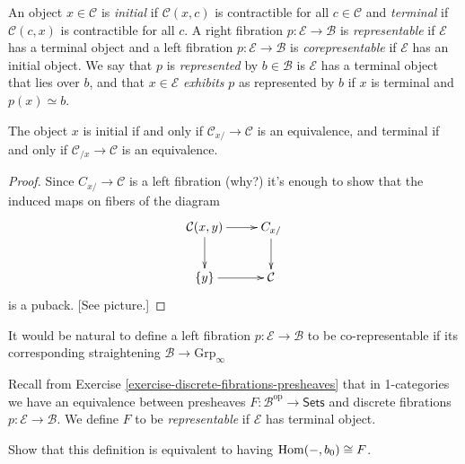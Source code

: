 \noindent
An object $x \in \mathcal{C}$ is {\it initial } if $\mathcal{C}(x,c)$ 
is contractible for all $c \in \mathcal{C}$ and
{\it terminal} if $\mathcal{C}(c,x)$ is contractible for all $c$.
A right fibration $p:\mathcal{E} \to \mathcal{B}$ is
{\it representable} if $\mathcal{E}$ has a terminal object
and a left fibration $p:\mathcal{E} \to \mathcal{B}$ is
{\it corepresentable} if $\mathcal{E}$ has an initial object.
We say that $p$ is {\it represented} by $b \in \mathcal{B}$
is $\mathcal{E}$ has a terminal object that lies over $b$,
and that $x \in \mathcal{E}$ {\it exhibits} $p$ 
as represented by $b$ if $x$ is terminal
and $p(x)\simeq b$.

\begin{lemma}
\label{lemma-equivalence-iff-initial}
The object $x$ is initial if and only if $\mathcal{C}_{x/}\to \mathcal{C}$ 
is an equivalence, and terminal if and only if $\mathcal{C}_{/x}\to \mathcal{C}$ 
is an equivalence.
\end{lemma}

\begin{proof}
Since $C_{x/}\to \mathcal{C}$ is a left fibration (why?)
it's enough to show that the induced maps on fibers of
the diagram
$$
\xymatrix{
\mathcal{C}(x,y)\ar[r]\ar[d]&C_{x/}\ar[d]\\
\{y\}\ar[r]&\mathcal{C}
}
$$
is a puback. [See picture.]
\end{proof}

\medskip\noindent
It would be natural to define a left fibration $p:\mathcal{E} \to \mathcal{B}$ 
to be co-representable if its corresponding straightening
$\mathcal{B} \to \text{Grp}_\infty$

Recall from 
Exercise \ref{exercise-discrete-fibrations-presheaves}
that in 1-categories we have an equivalence between presheaves
$F:\mathcal{B}^{\text{op}}\to \mathsf{Sets}$
and discrete fibrations $p:\mathcal{E} \to \mathcal{B}$.
We define $F$ to be {\it representable} if $\mathcal{E}$ 
has terminal object.

\begin{exercise}
\label{exercise-}
Show that this definition is equivalent to
having $\mathop{\mathrm{Hom}}\nolimits(-,b_0) \cong F$.
\end{exercise}

